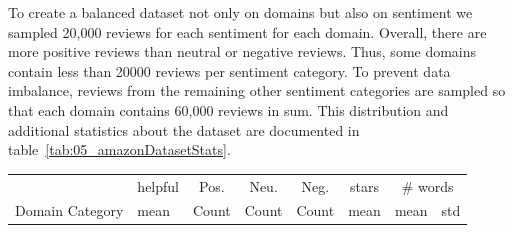 To create a balanced dataset not only on domains but also on sentiment we sampled 20,000 reviews for each sentiment for each domain. Overall, there are more positive reviews than neutral or negative reviews. Thus, some domains contain less than 20000 reviews per sentiment category. To prevent data imbalance, reviews from the remaining other sentiment categories are sampled so that each domain contains 60,000 reviews in sum. This distribution and additional statistics about the dataset are documented in table~\ref{tab:05_amazonDatasetStats}.
\begin{table} 
    \begin{tabularx}{\textwidth}{lXrrrcrr}
        
        \toprule
        {} & helpful & \multicolumn{1}{c}{Pos.} & \multicolumn{1}{c}{Neu.} & \multicolumn{1}{c}{Neg.} &\multicolumn{1}{c}{stars} & \multicolumn{2}{c}{\# words} \\
        Domain Category &                             mean &       Count & Count & Count &  mean     &  mean  &     std \\


\end{tabularx}
\end{table}
